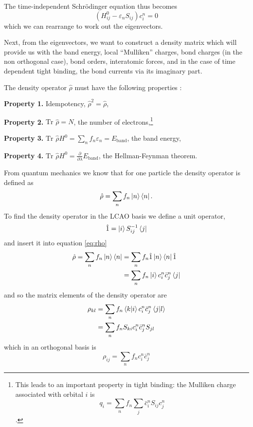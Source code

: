 \documentclass{article}
\begin{document}
\begin{multicols}{2}
The time-independent Schr{\"o}dinger equation thus becomes 
\begin{equation}
	(H^{0}_{ij}-\varepsilon_{n}S_{ij})c^{n}_{i}=0
\end{equation}
which we can rearrange to work out the eigenvectors.

Next, from the eigenvectors, we want to construct a density matrix which will provide us with the band energy, local “Mulliken” charges, bond charges (in the non orthogonal case),\cite{Finnis2003} bond orders,\cite{pettifor1995bonding} interatomic forces, and in the case of time dependent tight binding, the bond currents via its imaginary part.\cite{todorov2002tight}

The density operator $\hat{\rho}$ must have the following properties \cite{Paxton2009}:

\textbf{Property 1.} Idempotency, $\hat{\rho}^2=\hat{\rho}$,

\textbf{Property 2.} $\textrm{Tr }\hat{\rho}=N$, the number of electrons,\footnote{This leads to an important property in tight binding: the Mulliken charge associated with orbital $i$ is
\begin{equation}
	\label{eq:mulliken}
	q_{i}=\sum_{n}f_{n}\sum_{j}\bar{c}^{n}_{i}S_{ij}c^{n}_{j} 
\end{equation}.}

\textbf{Property 3.} $\textrm{Tr }\hat{\rho}H^0=\sum_nf_n\varepsilon_n=E_{\text{band}}$, the band energy,

\textbf{Property 4.} $\textrm{Tr }\hat{\rho}H^0=\frac{\partial}{\partial\lambda}E_{\text{band}}$, the Hellman-Feynman theorem.

From quantum mechanics \cite{schiff2quantum,kittel1965quantum} we know that for one particle the density operator is defined as 
\begin{equation}
	\label{eq:rho}
	\hat{\rho}=\sum_{n}f_{n}\ket{n}\bra{n}.
\end{equation}
To find the density operator in the LCAO basis we define a unit operator,
\begin{equation}
	\hat{1}=\ket{i}S^{-1}_{ij}\bra{j}
	\label{eq:unit}
\end{equation}
and insert it into equation \ref{eq:rho}
\begin{equation}
	\begin{split}
		\hat{\rho}=\sum_{n}f_{n}\ket{n}\bra{n}&=\sum_{n}f_{n}\hat{1}\ket{n}\bra{n}\hat{1} \\
		&=\sum_{n}f_{n}\ket{i}c^{n}_{i}\bar{c}^{n}_{j}\bra{j}
	\end{split}
\end{equation}
and so the matrix elements of the density operator are 
\begin{equation}
	\begin{split}
		\rho_{kl}&=\sum_{n}f_{n}\bra{k}\ket{i}c^{n}_{i}\bar{c}^{n}_{j}\bra{j}\ket{l} \\
		&=\sum_{n}f_{n}S_{ki}c^{n}_{i}\bar{c}^{n}_{j}S_{jl}
	\end{split}
\end{equation}
which in an orthogonal basis is 
\begin{equation}
	\rho_{ij}=\sum_{n}f_{n}c^{n}_{i}\bar{c}^{n}_{j}
\end{equation}


\end{multicols}
\end{document}
